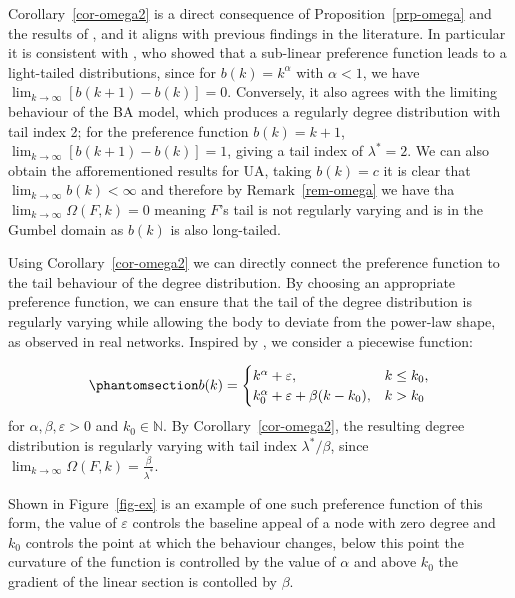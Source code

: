 \documentclass[
  sn-basic,
  10pt,
]{sn-jnl}
\theoremstyle{thmstyleone}
\theoremstyle{thmstyleone}
\theoremstyle{remark}
\theoremstyle{plain}
\theoremstyle{plain}
\theoremstyle{remark}
\begin{document}
Corollary~\ref{cor-omega2} is a direct consequence of
Proposition~\ref{prp-omega} and the results of \citet{shimura12}, and it
aligns with previous findings in the literature. In particular it is
consistent with \citet{krapivsky01}, who showed that a sub-linear
preference function leads to a light-tailed distributions, since for
\(b(k)=k^\alpha\) with \(\alpha<1\), we have
\(\lim_{k\rightarrow\infty}[b(k+1)-b(k)]=0\). Conversely, it also agrees
with the limiting behaviour of the BA model, which produces a regularly
degree distribution with tail index 2; for the preference function
\(b(k)=k+1\), \(\lim_{k\rightarrow\infty}[b(k+1)-b(k)]=1\), giving a
tail index of \(\lambda^*=2\). We can also obtain the afforementioned
results for UA, taking \(b(k)=c\) it is clear that
\(\lim_{k\rightarrow\infty}b(k)<\infty\) and therefore by
Remark~\ref{rem-omega} we have tha
\(\lim_{k\rightarrow\infty}\Omega(F,k)=0\) meaning \(F\)'s tail is not
regularly varying and is in the Gumbel domain as \(b(k)\) is also
long-tailed.

Using Corollary~\ref{cor-omega2} we can directly connect the preference
function to the tail behaviour of the degree distribution. By choosing
an appropriate preference function, we can ensure that the tail of the
degree distribution is regularly varying while allowing the body to
deviate from the power-law shape, as observed in real networks. Inspired
by \citet{Lee24}, we consider a piecewise function:

\begin{equation}\phantomsection\label{eq-pref}{
b(k) = \begin{cases}
k^\alpha + \varepsilon,&k\le k_0,\\
k_0^\alpha + \varepsilon + \beta(k-k_0), &k> k_0
\end{cases}
}\end{equation} for \(\alpha,\beta, \varepsilon>0\) and
\(k_0\in\mathbb N\). By Corollary~\ref{cor-omega2}, the resulting degree
distribution is regularly varying with tail index \(\lambda^*/\beta\),
since
\(\lim_{k\rightarrow\infty}\Omega(F,k) = \frac{\beta}{\lambda^*}\).

Shown in Figure~\ref{fig-ex} is an example of one such preference
function of this form, the value of \(\varepsilon\) controls the
baseline appeal of a node with zero degree and \(k_0\) controls the
point at which the behaviour changes, below this point the curvature of
the function is controlled by the value of \(\alpha\) and above \(k_0\)
the gradient of the linear section is contolled by \(\beta\).
\end{document}
